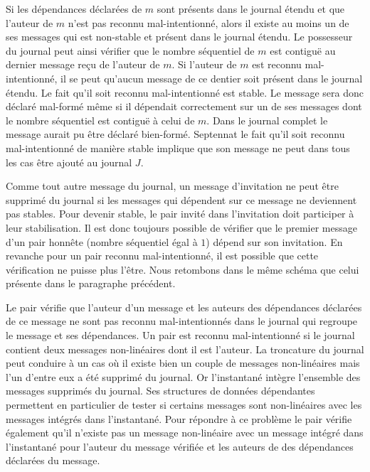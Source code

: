 Si les dépendances déclarées de $m$ sont présents dans le journal étendu et que l'auteur de $m$ n'est pas reconnu mal-intentionné, alors il existe au moins un de ses messages qui est non-stable et présent dans le journal étendu.
Le possesseur du journal peut ainsi vérifier que le nombre séquentiel de $m$ est contiguë au dernier message reçu de l'auteur de $m$.
Si l'auteur de $m$ est reconnu mal-intentionné, il se peut qu'aucun message de ce dentier soit présent dans le journal étendu.
Le fait qu'il soit reconnu mal-intentionné est stable.
Le message sera donc déclaré mal-formé même si il dépendait correctement sur un de ses messages dont le nombre séquentiel est contiguë à celui de $m$.
Dans le journal complet le message aurait pu être déclaré bien-formé.
Septennat le fait qu'il soit reconnu mal-intentionné de manière stable implique que son message ne peut dans tous les cas être ajouté au journal $J$.

Comme tout autre message du journal, un message d'invitation ne peut être supprimé du journal si les messages qui dépendent sur ce message ne deviennent pas stables.
Pour devenir stable, le pair invité dans l'invitation doit participer à leur stabilisation.
Il est donc toujours possible de vérifier que le premier message d'un pair honnête (nombre séquentiel égal à $1$) dépend sur son invitation.
En revanche pour un pair reconnu mal-intentionné, il est possible que cette vérification ne puisse plus l'être.
Nous retombons dans le même schéma que celui présente dans le paragraphe précédent.

Le pair vérifie que l'auteur d'un message et les auteurs des dépendances déclarées de ce message ne sont pas reconnu mal-intentionnés dans le journal qui regroupe le message et ses dépendances.
Un pair est reconnu mal-intentionné si le journal contient deux messages non-linéaires dont il est l'auteur.
La troncature du journal peut conduire à un cas où il existe bien un couple de messages non-linéaires mais l'un d'entre eux a été supprimé du journal.
Or l'instantané intègre l'ensemble des messages supprimés du journal.
Ses structures de données dépendantes permettent en particulier de tester si certains messages sont non-linéaires avec les messages intégrés dans l'instantané.
Pour répondre à ce problème le pair vérifie également qu'il n'existe pas un message non-linéaire avec un message intégré dans l'instantané pour l'auteur du message vérifiée et les auteurs de des dépendances déclarées du message.

